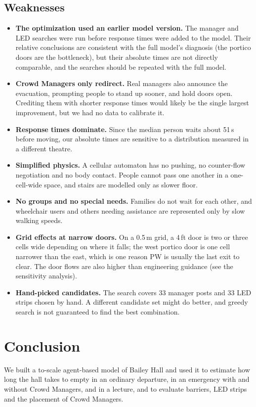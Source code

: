 \documentclass{article}
\begin{document}
\subsection{Weaknesses}
\begin{itemize}
    \item \textbf{The optimization used an earlier model version.} The manager and LED searches were run before response times were added to the model. Their relative conclusions are consistent with the full model's diagnosis (the portico doors are the bottleneck), but their absolute times are not directly comparable, and the searches should be repeated with the full model.
    \item \textbf{Crowd Managers only redirect.} Real managers also announce the evacuation, prompting people to stand up sooner, and hold doors open. Crediting them with shorter response times would likely be the single largest improvement, but we had no data to calibrate it.
    \item \textbf{Response times dominate.} Since the median person waits about 51\,s before moving, our absolute times are sensitive to a distribution measured in a different theatre.
    \item \textbf{Simplified physics.} A cellular automaton has no pushing, no counter-flow negotiation and no body contact. People cannot pass one another in a one-cell-wide space, and stairs are modelled only as slower floor.
    \item \textbf{No groups and no special needs.} Families do not wait for each other, and wheelchair users and others needing assistance are represented only by slow walking speeds.
    \item \textbf{Grid effects at narrow doors.} On a 0.5\,m grid, a 4\,ft door is two or three cells wide depending on where it falls; the west portico door is one cell narrower than the east, which is one reason PW is usually the last exit to clear. The door flows are also higher than engineering guidance (see the sensitivity analysis).
    \item \textbf{Hand-picked candidates.} The search covers 33 manager posts and 33 LED strips chosen by hand. A different candidate set might do better, and greedy search is not guaranteed to find the best combination.
\end{itemize}

\section{Conclusion}
We built a to-scale agent-based model of Bailey Hall and used it to estimate how long the hall takes to empty in an ordinary departure, in an emergency with and without Crowd Managers, and in a lecture, and to evaluate barriers, LED strips and the placement of Crowd Managers.
\end{document}
